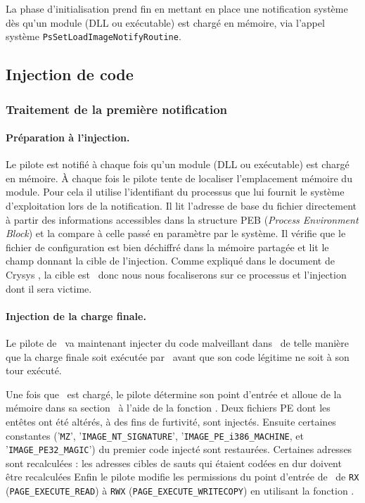 La phase d'initialisation prend fin en mettant en place une notification système dès qu'un module (DLL ou exécutable) est chargé en mémoire, via l'appel système \texttt{PsSetLoadImageNotifyRoutine}.

\subsection{Injection de code}
\subsubsection{Traitement de la première notification}
\paragraph{Préparation à l'injection.}
Le pilote est notifié à chaque fois qu'un module (DLL ou exécutable) est chargé en mémoire.
À chaque fois le pilote tente de localiser l'emplacement mémoire du module.
Pour cela il utilise l'identifiant du processus que lui fournit le système d'exploitation lors de la notification.
Il lit l'adresse de base du fichier directement à partir des informations accessibles dans la structure PEB (\emph{Process Environment Block}) et la compare à celle passé en paramètre par le système.
Il vérifie que le fichier de configuration est bien déchiffré dans la mémoire partagée et lit le champ donnant la cible de l'injection.
Comme expliqué dans le document de Crysys \cite{CrysysDuquStuxnet}, la cible est \services\ donc nous nous focaliserons sur ce processus et l'injection dont il sera victime.

\paragraph{Injection de la charge finale.}
Le pilote de \duqu\ va maintenant injecter du code malveillant dans \services\ de telle manière que la charge finale soit exécutée par \services\ avant que son code légitime ne soit à son tour exécuté.

Une fois que \services\ est chargé, le pilote détermine son point d'entrée et alloue de la mémoire dans sa section \pdata\ à l'aide de la fonction \ZwA.
Deux fichiers PE dont les entêtes ont été altérés, à des fins de furtivité, sont injectés.
Ensuite certaines constantes ('\texttt{MZ}', '\texttt{IMAGE\_NT\_SIGNATURE}', '\texttt{IMAGE\_PE\_i386\_MACHINE}, et '\texttt{IMAGE\_PE32\_MAGIC}') du premier code injecté sont restaurées.
Certaines adresses sont recalculées : les adresses cibles de sauts qui étaient codées en dur doivent être recalculées
Enfin le pilote modifie les permissions du point d'entrée de \services\ de \texttt{RX} (\texttt{PAGE\_EXECUTE\_READ}) à \texttt{RWX} (\texttt{PAGE\_EXECUTE\_WRITECOPY}) en utilisant la fonction \ZwP.

